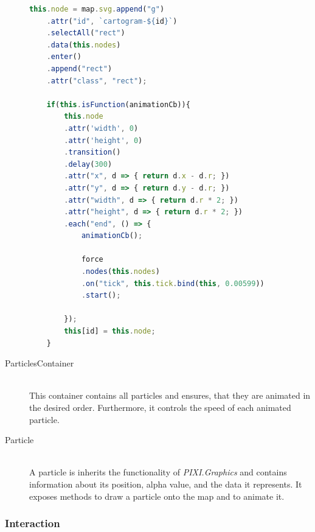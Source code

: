 \begin{description}
\begin{lstlisting}[language=JavaScript, caption={The draw-function of the pseudo Demers Cartogramm-class}, label={lst:cartogram-part-draw}]
    this.node = map.svg.append("g")
    .attr("id", `cartogram-${id}`)
    .selectAll("rect")
    .data(this.nodes)
    .enter()
    .append("rect")
    .attr("class", "rect");

    if(this.isFunction(animationCb)){
        this.node
        .attr('width', 0)
        .attr('height', 0)
        .transition()
        .delay(300)
        .attr("x", d => { return d.x - d.r; })
        .attr("y", d => { return d.y - d.r; })
        .attr("width", d => { return d.r * 2; })
        .attr("height", d => { return d.r * 2; })
        .each("end", () => {
            animationCb();

            force
            .nodes(this.nodes)
            .on("tick", this.tick.bind(this, 0.00599))
            .start();

        });
        this[id] = this.node;
    }
\end{lstlisting}

\item[ParticlesContainer] \hfill \\
This container contains all particles and ensures, that they are animated in the desired order. Furthermore, it controls the speed of each animated particle.

\item[Particle] \hfill \\
A particle is inherits the functionality of \textit{PIXI.Graphics} and contains information about its position, alpha value, and the data it represents. It exposes methods to draw a particle onto the map and to animate it.

\end{description}


\subsubsection{Interaction}
